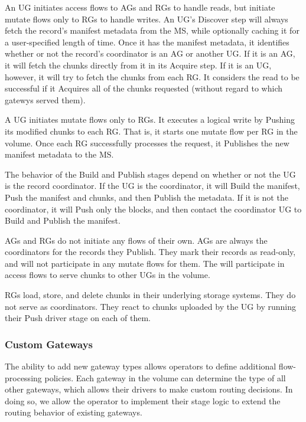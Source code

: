 An UG initiates access flows to AGs and RGs to handle reads, but initiate mutate
flows only to RGs to handle writes.  An UG's Discover step will always fetch the
record's manifest metadata from the MS, while optionally caching it for a
user-specified length of time.  Once it has the manifest metadata, it identifies
whether or not the record's coordinator is an AG or another UG.   If it is an
AG, it will fetch the chunks directly from it in its Acquire step.  If it is an
UG, however, it will try to fetch the chunks from each RG.  It considers the
read to be successful if it Acquires all of the chunks requested (without regard
to which gatewys served them).

A UG initiates mutate flows only to RGs.  It executes a logical write by Pushing
its modified chunks to each RG.  That is, it starts one mutate flow per RG in
the volume.  Once each RG successfully processes the request, it Publishes the
new manifest metadata to the MS.

The behavior of the Build and Publish stages depend on whether or not the UG is
the record coordinator.  If the UG is the coordinator, it will Build the
manifest, Push the manifest and chunks, and then Publish the metadata.  If it is
not the coordinator, it will Push only the blocks, and then
contact the coordinator UG to Build and Publish the manifest.

AGs and RGs do not initiate any flows of
their own.  AGs are always the coordinators for the records they Publish.  They mark their
records as read-only, and will not participate in any mutate flows for them.
The will participate in access flows to serve chunks to other UGs in the volume.

RGs load, store, and delete chunks in their underlying storage systems.  They do
not serve as coordinators.  They react to chunks uploaded by the UG by running
their Push driver stage on each of them.

\subsubsection{Custom Gateways}

The ability to add new gateway types allows operators to define additional
flow-processing policies.  Each gateway in the volume can determine the type of
all other gateways, which allows their drivers to make custom routing decisions.
In doing so, we allow the operator to implement their stage logic to extend the
routing behavior of existing gateways.

